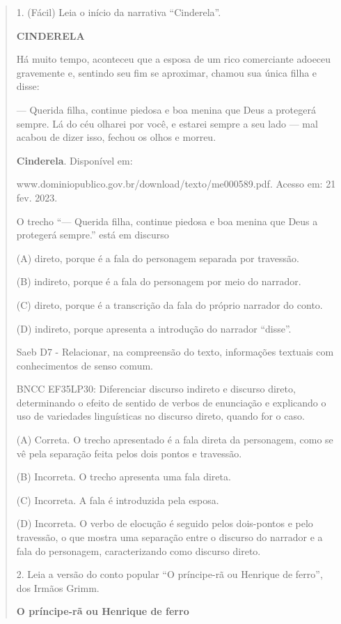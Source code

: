 \begin{quote}
1. (Fácil) Leia o início da narrativa ``Cinderela''.

\textbf{CINDERELA}

Há muito tempo, aconteceu que a esposa de um rico comerciante adoeceu
gravemente e, sentindo seu fim se aproximar, chamou sua única filha e
disse:

--- Querida filha, continue piedosa e boa menina que Deus a protegerá
sempre. Lá do céu olharei por você, e estarei sempre a seu lado --- mal
acabou de dizer isso, fechou os olhos e morreu.

\textbf{Cinderela}. Disponível em:

www.dominiopublico.gov.br/download/texto/me000589.pdf. Acesso em: 21
fev. 2023.

O trecho ``--- Querida filha, continue piedosa e boa menina que Deus a
protegerá sempre.'' está em discurso

(A) direto, porque é a fala do personagem separada por travessão.

(B) indireto, porque é a fala do personagem por meio do narrador.

(C) direto, porque é a transcrição da fala do próprio narrador do conto.

(D) indireto, porque apresenta a introdução do narrador ``disse''.

Saeb D7 - Relacionar, na compreensão do texto, informações textuais com
conhecimentos de senso comum.

BNCC EF35LP30: Diferenciar discurso indireto e discurso direto,
determinando o efeito de sentido de verbos de enunciação e explicando o
uso de variedades linguísticas no discurso direto, quando for o caso.

(A) Correta. O trecho apresentado é a fala direta da personagem, como se
vê pela separação feita pelos dois pontos e travessão.

(B) Incorreta. O trecho apresenta uma fala direta.

(C) Incorreta. A fala é introduzida pela esposa.

(D) Incorreta. O verbo de elocução é seguido pelos dois-pontos e pelo
travessão, o que mostra uma separação entre o discurso do narrador e a
fala do personagem, caracterizando como discurso direto.

2. Leia a versão do conto popular ``O príncipe-rã ou Henrique de
ferro'', dos Irmãos Grimm.

\textbf{O príncipe-rã ou Henrique de ferro}


\end{quote}
